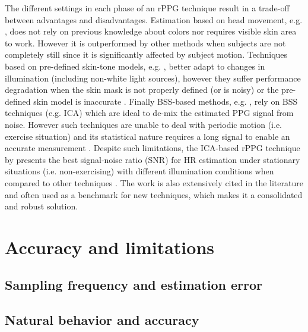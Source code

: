 The different settings in each phase of an rPPG technique result in a trade-off between advantages and disadvantages. Estimation based on head movement, e.g. \textcite{6619284}, does not rely on previous knowledge about colors nor requires visible skin area to work. However it is outperformed by other methods when subjects are not completely still \parencite{li2014remote} since it is significantly affected by subject motion. Techniques based on pre-defined skin-tone models, e.g. \textcite{Wang_2016novel,de_Haan_2013}, better adapt to changes in illumination (including non-white light sources), however they suffer performance degradation when the skin mask is not properly defined (or is noisy) or the pre-defined skin model is inaccurate \parencite{Wang_2016algorithmic}. Finally BSS-based methods, e.g. \textcite{poh2011advancements}, rely on BSS techniques (e.g. ICA) which are ideal to de-mix the estimated PPG signal from noise. However such techniques are unable to deal with periodic motion (i.e. exercise situation) and its statistical nature requires a long signal to enable an accurate measurement \parencite{Wang_2016algorithmic}. Despite such limitations, the ICA-based rPPG technique by \textcite{poh2011advancements} presents the best signal-noise ratio (SNR) for HR estimation under stationary situations (i.e. non-exercising) with different illumination conditions when compared to other techniques \parencite{Wang_2016novel}. The work is also extensively cited in the literature and often used as a benchmark for new techniques, which makes it a consolidated and robust solution.

\section{Accuracy and limitations}

\subsection{Sampling frequency and estimation error}


\subsection{Natural behavior and accuracy}

